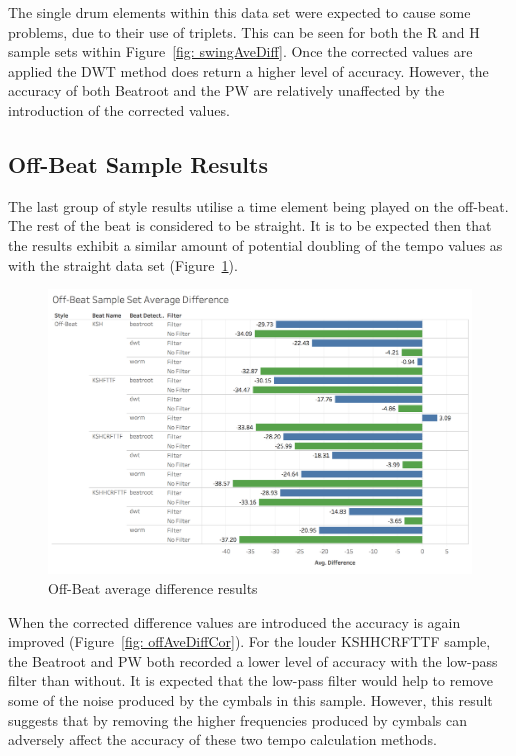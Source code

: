 \documentclass[a4paper, 11pt]{article}
\begin{document}
The single drum elements within this data set were expected to cause some problems, due to their use of triplets. This can be seen for both the R and H sample sets within Figure~\ref{fig: swingAveDiff}. Once the corrected values are applied the DWT method does return a higher level of accuracy. However, the accuracy of both Beatroot and the PW are relatively unaffected by the introduction of the corrected values.

\subsection{Off-Beat Sample Results}

The last group of style results utilise a time element being played on the off-beat. The rest of the beat is considered to be straight. It is to be expected then that the results exhibit a similar amount of potential doubling of the tempo values as with the straight data set (Figure~\ref{fig: offAveDiff}).

\begin{figure}[h]
\centering
\includegraphics[scale=0.25]{images/OBSSAD.jpg}
\caption{Off-Beat average difference results}
\label{fig: offAveDiff}
\end{figure}

When the corrected difference values are introduced the accuracy is again improved (Figure~\ref{fig: offAveDiffCor}). For the louder KSHHCRFTTF sample, the Beatroot and PW both recorded a lower level of accuracy with the low-pass filter than without. It is expected that the low-pass filter would help to remove some of the noise produced by the cymbals in this sample. However, this result suggests that by removing the higher frequencies produced by cymbals can adversely affect the accuracy of these two tempo calculation methods.
\end{document}
